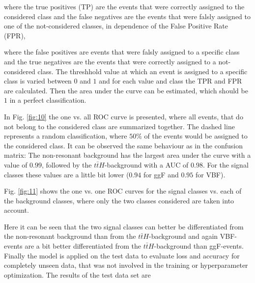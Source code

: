 
where the true positives (TP) are the events that were correctly assigned to the considered class and the false negatives are the events that were falsly assigned to one of the not-considered classes,
in dependence of the False Positive Rate (FPR),


where the false positives are events that were falsly assigned to a specific class and the true negatives are the events that were correctly assigned to a not-considered class.
The threshhold value at which an event is assigned to a specific class is varied between $0$ and $1$ and for each value and class the TPR and FPR are calculated. Then the area under the curve can be estimated,
which should be $1$ in a perfect classification. 


In Fig. \ref{fig:10} the one vs. all ROC curve is presented,
where all events, that do not belong to the considered class are summarized together. The dashed line represents a random classification, where $50 \%$ of the events would be assigned to the considered
class. It can be observed the same behaviour as in the confusion matrix: The non-resonant background has the largest area under the curve with a value of $0.99$, followed by the $t \bar{t}H$-background with a AUC of $0.98$. For the signal classes these
values are a little bit lower ($0.94$ for ggF and $0.95$ for VBF).

Fig. \ref{fig:11} shows the one vs. one ROC curves for the signal classes vs. each of the background classes, where only the two classes considered are taken into account. 


Here it can be seen that the two signal classes can better be differentiated from the non-resonant background than from the $t \bar{t}H$-background and again VBF-events are a bit
better differentiated from the $t \bar{t}H$-background than ggF-events. Finally the model is applied on the test data to evaluate loss and accuracy for completely unseen data, that was not
involved in the training or hyperparameter optimization. The results of the test data set are


